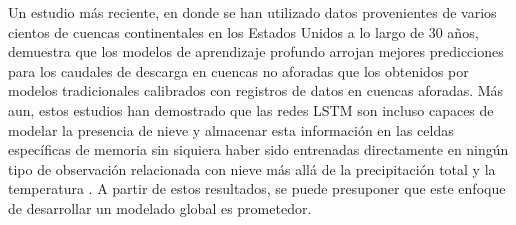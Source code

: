 Un estudio más reciente\cite{nearing}\cite{Kratzert}, en donde se han utilizado datos provenientes de varios cientos de cuencas 
continentales en los Estados Unidos a lo largo de 30 años, demuestra que los modelos de aprendizaje profundo arrojan 
mejores predicciones para los caudales de descarga en cuencas no aforadas que los obtenidos por modelos tradicionales 
calibrados con registros de datos en cuencas aforadas. 
Más aun, estos estudios han demostrado que las redes LSTM son incluso capaces de modelar la presencia de nieve y 
almacenar esta información en las celdas específicas de memoria sin siquiera haber sido entrenadas directamente en 
ningún tipo de observación relacionada con nieve más allá de la precipitación total y la temperatura \cite{Kratzert2}.
A partir de estos resultados, se puede presuponer que este enfoque de desarrollar
un modelado global es prometedor. 







